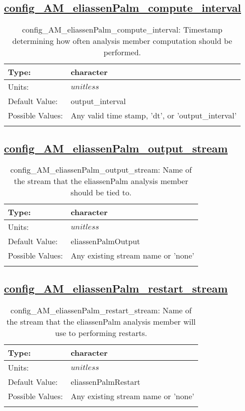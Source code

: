 \subsection[config\_AM\_eliassenPalm\_compute\_interval]{\hyperref[sec:nm_tab_AM_eliassenPalm]{config\_AM\_eliassenPalm\_compute\_interval}}
\label{subsec:nm_sec_config_AM_eliassenPalm_compute_interval}
\begin{center}
\begin{longtable}{| p{2.0in} || p{4.0in} |}
    \hline
    Type: & character \\
    \hline
    Units: & $unitless$ \\
    \hline
    Default Value: & output\_interval \\
    \hline
    Possible Values: & Any valid time stamp, 'dt', or 'output\_interval' \\
    \hline
    \caption{config\_AM\_eliassenPalm\_compute\_interval: Timestamp determining how often analysis member computation should be performed.}
\end{longtable}
\end{center}
\subsection[config\_AM\_eliassenPalm\_output\_stream]{\hyperref[sec:nm_tab_AM_eliassenPalm]{config\_AM\_eliassenPalm\_output\_stream}}
\label{subsec:nm_sec_config_AM_eliassenPalm_output_stream}
\begin{center}
\begin{longtable}{| p{2.0in} || p{4.0in} |}
    \hline
    Type: & character \\
    \hline
    Units: & $unitless$ \\
    \hline
    Default Value: & eliassenPalmOutput \\
    \hline
    Possible Values: & Any existing stream name or 'none' \\
    \hline
    \caption{config\_AM\_eliassenPalm\_output\_stream: Name of the stream that the eliassenPalm analysis member should be tied to.}
\end{longtable}
\end{center}
\subsection[config\_AM\_eliassenPalm\_restart\_stream]{\hyperref[sec:nm_tab_AM_eliassenPalm]{config\_AM\_eliassenPalm\_restart\_stream}}
\label{subsec:nm_sec_config_AM_eliassenPalm_restart_stream}
\begin{center}
\begin{longtable}{| p{2.0in} || p{4.0in} |}
    \hline
    Type: & character \\
    \hline
    Units: & $unitless$ \\
    \hline
    Default Value: & eliassenPalmRestart \\
    \hline
    Possible Values: & Any existing stream name or 'none' \\
    \hline
    \caption{config\_AM\_eliassenPalm\_restart\_stream: Name of the stream that the eliassenPalm analysis member will use to performing restarts.}
\end{longtable}
\end{center}
